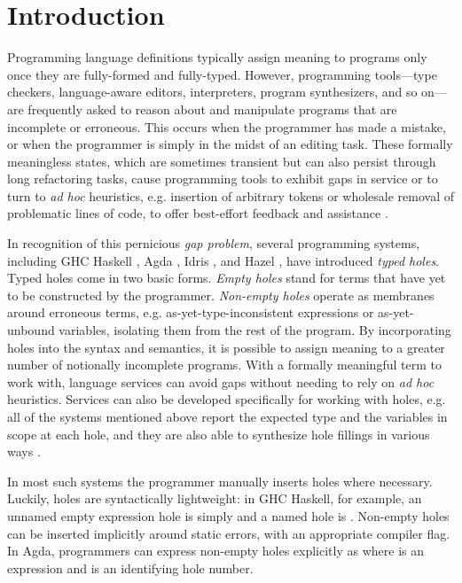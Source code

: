 \section{Introduction}
\label{sec:intro}

Programming language definitions typically assign meaning to programs only once they are fully-formed and fully-typed. 
However, programming tools---type checkers, language-aware editors, interpreters, program synthesizers, and so on---%
are frequently asked to reason about and manipulate programs that are incomplete or erroneous.
This occurs when the programmer has made a mistake, or when the programmer is simply in the midst of an editing task.
These formally meaningless states, which are sometimes transient but can also persist through long refactoring tasks, cause programming tools to exhibit gaps in service or to turn to  
\emph{ad hoc} heuristics, e.g. insertion of arbitrary tokens or wholesale removal of problematic lines of code, to offer best-effort feedback and assistance \cite{HazelnutSNAPL, DBLP:conf/oopsla/KatsJNV09}.

In recognition of this pernicious \emph{gap problem}, several programming systems, 
including GHC Haskell \cite{GHCHoles}, Agda \cite{norell:thesis}, Idris \cite{brady2013idris}, and Hazel \cite{DBLP:conf/popl/OmarVHAH17}, have introduced \emph{typed holes}. Typed holes come in two basic forms. \emph{Empty holes} 
stand for terms that have yet to be constructed by the programmer. 
\emph{Non-empty holes} 
operate as membranes around erroneous terms, e.g. as-yet-type-inconsistent
expressions or as-yet-unbound variables, 
isolating them from the rest of the program.
By incorporating holes into the syntax and semantics, 
it is possible to assign meaning to a greater number of notionally incomplete programs.
With a formally meaningful term to work with, language services can avoid gaps without needing to rely on \emph{ad hoc} heuristics.
Services can also be developed specifically for working with holes, e.g. all of the systems mentioned above report  
the expected type and the variables in scope at each hole, and they are also able to synthesize hole fillings in various ways \cite{DBLP:conf/haskell/Gissurarson18,DBLP:journals/pacmpl/LubinCOC20}.

In most such systems the programmer manually inserts holes where necessary.
Luckily, holes are syntactically lightweight: in GHC Haskell, for example, an unnamed empty expression
hole is simply \li{_} and a named hole is . 
Non-empty holes can be inserted implicitly around static errors, with an appropriate compiler flag. 
In Agda, programmers can express  
non-empty holes explicitly as  where  is an expression and  is an identifying hole number.

